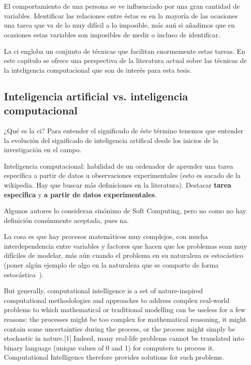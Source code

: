 \chapter{}
\label{ch:sota-ci}

El comportamiento de una persona se ve influenciado por una gran cantidad de variables. Identificar las relaciones entre éstas es en la mayoría de las ocasiones una tarea que va de lo muy difícil a lo imposible, más auń si añadimos que en ocasiones estas variables son imposibles de medir o incluso de identificar.

La \gls{ci} engloba un conjunto de técnicas que facilitan enormemente estas tareas. En este capítulo se ofrece una perspectiva de la literatura actual sobre las técnicas de la inteligencia computacional que son de interés para esta tesis.

\section{Inteligencia artificial vs. inteligencia computacional}

¿Qué es la \gls{ci}? Para entender el significado de éste término tenemos que entender la evolución del significado de inteligencia artifical desde los inicios de la investigación en el campo.

Inteligencia computacional: habilidad de un ordenador de aprender una tarea específica a partir de datos u observaciones experimentales (esto es sacado de la wikipedia. Hay que buscar más definiciones en la literatura). Destacar \textbf{tarea específica} y \textbf{a partir de datos experimentales}.

Algunos autores lo consideran sinónimo de Soft Computing, pero no como no hay definición comúnmente aceptada, pues na.

La cosa es que hay procesos matemáticos muy complejos, con mucha interdependencia entre variables y factores que hacen que los problemas sean muy difíciles de modelar, más aún cuando el problema en su naturaleza es estocástico (poner algún ejemplo de algo en la naturaleza que se comporte de forma estocástica~\cite{siddique2013computational}).

But generally, computational intelligence is a set of nature-inspired computational methodologies and approaches to address complex real-world problems to which mathematical or traditional modelling can be useless for a few reasons: the processes might be too complex for mathematical reasoning, it might contain some uncertainties during the process, or the process might simply be stochastic in nature.[1] Indeed, many real-life problems cannot be translated into binary language (unique values of 0 and 1) for computers to process it. Computational Intelligence therefore provides solutions for such problems.



